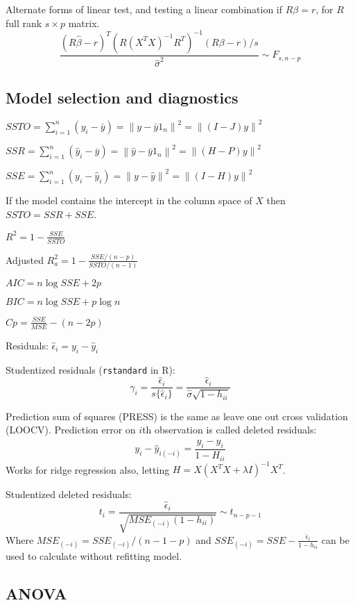 \documentclass[10pt, twocolumn]{article}
\newcommand{\norm}[1]{\left\lVert#1\right\rVert}
\begin{document}
Alternate forms of linear test, and testing a linear combination if $R\beta
= r$, for $R$ full rank $s \times p$ matrix.
\[
    \frac{(R \hat{\beta} - r)^T (R(X^T X)^{-1} R^T)^{-1} (R \beta - r) / s}
    {\hat{\sigma}^2} \sim F_{s, n-p}
\]


\subsection*{Model selection and diagnostics}

$SSTO = \sum_{i=1}^n (y_i - \bar{y}) = \norm{y - \bar{y} 1_n }^2
        = \norm{(I - J)y}^2$

$SSR = \sum_{i=1}^n (\hat{y}_i - \bar{y}) = \norm{\hat{y} - \bar{y} 1_n}^2
    = \norm{(H - P)y}^2$

$SSE = \sum_{i=1}^n (y_i - \hat{y}_i) = \norm{y - \hat{y}}^2
        = \norm{(I - H)y}^2$

If the model contains the intercept in the column space of $X$  then $SSTO = SSR + SSE$.

$R^2 = 1 - \frac{SSE}{SSTO}$

Adjusted $R^2_a = 1 - \frac{SSE / (n-p)}{SSTO / (n-1)}$

$AIC = n \log SSE + 2p$

$BIC = n \log SSE + p \log n$

$Cp = \frac{SSE}{MSE} - (n - 2p)$

Residuals: $\hat{\epsilon}_i = y_i - \hat{y}_i$

Studentized residuals (\texttt{rstandard} in R): 
\[
    \gamma_i =
    \frac{\hat{\epsilon}_i}{ s \{ \hat{\epsilon}_i \} } = 
    \frac{\hat{\epsilon}_i}{\hat{\sigma} \sqrt{1 - h_{ii}}}
\]

Prediction sum of squares (PRESS) is the same as leave one out cross
validation (LOOCV). Prediction error on $i$th observation is called deleted
residuals:
\[
    y_i - \hat{y}_{i (-i)} = \frac{y_i - \hat{y}_i}{1 - H_{ii}}
\]
Works for ridge regression also, letting 
$H = X(X^T X + \lambda I)^{-1} X^T$.

Studentized deleted residuals: 
\[
    t_i = \frac{\hat{\epsilon}_i}{\sqrt{MSE_{(-i)} (1 - h_{ii})}} \sim t_{n - p -1}
\]
Where $MSE_{(-i)} = SSE_{(-i)} / (n - 1 - p)$ and
$SSE_{(-i)} = SSE - \frac{\hat{\epsilon}_i}{1 - h_{ii}}$ can be used to
calculate without refitting model.

\subsection*{ANOVA}
\end{document}
